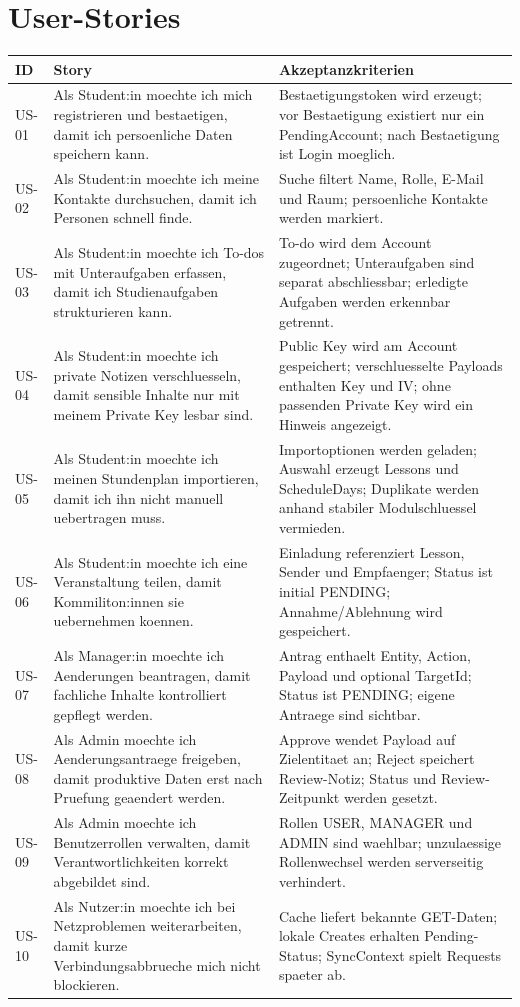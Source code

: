 \documentclass[11pt,a4paper]{article}
\begin{document}
\section{User-Stories}
\begin{longtable}{@{}p{18mm}p{105mm}p{26mm}@{}}
\toprule
ID & Story & Akzeptanzkriterien\\
\midrule
\endhead
US-01 & Als Student:in moechte ich mich registrieren und bestaetigen, damit ich persoenliche Daten speichern kann. & Bestaetigungstoken wird erzeugt; vor Bestaetigung existiert nur ein PendingAccount; nach Bestaetigung ist Login moeglich.\\
US-02 & Als Student:in moechte ich meine Kontakte durchsuchen, damit ich Personen schnell finde. & Suche filtert Name, Rolle, E-Mail und Raum; persoenliche Kontakte werden markiert.\\
US-03 & Als Student:in moechte ich To-dos mit Unteraufgaben erfassen, damit ich Studienaufgaben strukturieren kann. & To-do wird dem Account zugeordnet; Unteraufgaben sind separat abschliessbar; erledigte Aufgaben werden erkennbar getrennt.\\
US-04 & Als Student:in moechte ich private Notizen verschluesseln, damit sensible Inhalte nur mit meinem Private Key lesbar sind. & Public Key wird am Account gespeichert; verschluesselte Payloads enthalten Key und IV; ohne passenden Private Key wird ein Hinweis angezeigt.\\
US-05 & Als Student:in moechte ich meinen Stundenplan importieren, damit ich ihn nicht manuell uebertragen muss. & Importoptionen werden geladen; Auswahl erzeugt Lessons und ScheduleDays; Duplikate werden anhand stabiler Modulschluessel vermieden.\\
US-06 & Als Student:in moechte ich eine Veranstaltung teilen, damit Kommiliton:innen sie uebernehmen koennen. & Einladung referenziert Lesson, Sender und Empfaenger; Status ist initial PENDING; Annahme/Ablehnung wird gespeichert.\\
US-07 & Als Manager:in moechte ich Aenderungen beantragen, damit fachliche Inhalte kontrolliert gepflegt werden. & Antrag enthaelt Entity, Action, Payload und optional TargetId; Status ist PENDING; eigene Antraege sind sichtbar.\\
US-08 & Als Admin moechte ich Aenderungsantraege freigeben, damit produktive Daten erst nach Pruefung geaendert werden. & Approve wendet Payload auf Zielentitaet an; Reject speichert Review-Notiz; Status und Review-Zeitpunkt werden gesetzt.\\
US-09 & Als Admin moechte ich Benutzerrollen verwalten, damit Verantwortlichkeiten korrekt abgebildet sind. & Rollen USER, MANAGER und ADMIN sind waehlbar; unzulaessige Rollenwechsel werden serverseitig verhindert.\\
US-10 & Als Nutzer:in moechte ich bei Netzproblemen weiterarbeiten, damit kurze Verbindungsabbrueche mich nicht blockieren. & Cache liefert bekannte GET-Daten; lokale Creates erhalten Pending-Status; SyncContext spielt Requests spaeter ab.\\
\bottomrule
\end{longtable}
\end{document}
